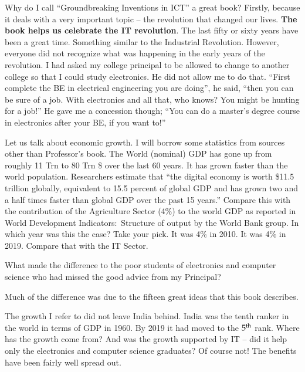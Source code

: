 \begin{multicols}{2}

Why do I call “Groundbreaking Inventions in ICT” a great book? Firstly, because it deals with a very important topic – the revolution that changed our lives. \textbf{The book helps us celebrate the IT revolution}. The last fifty or sixty years have been a great time. Something similar to the Industrial Revolution. However, everyone did not recognize what was happening in the early years of the revolution. I had asked my college principal to be allowed to change to another college so that I could study electronics. He did not allow me to do that. “First complete the BE in electrical engineering you are doing”, he said, “then you can be sure of a job. With electronics and all that, who knows? You might be hunting for a job!” He gave me a concession though; “You can do a master’s degree course in electronics after your BE, if you want to!”

\vspace{-.1cm}

Let us talk about economic growth. I will borrow some statistics from sources other than Professor’s book. The World (nominal) GDP has gone up from roughly 11 Trn to 80 Trn \$ over the last 60 years. It has grown faster than the world population. Researchers estimate that “the digital economy is worth \$11.5 trillion globally, equivalent to 15.5 percent of global GDP and has grown two and a half times faster than global GDP over the past 15 years.” Compare this with the contribution of the Agriculture Sector (4\%) to the world GDP as reported in World Development Indicators: Structure of output \cite{art3-key01} by the World Bank group. In which year was this the case? Take your pick. It was 4\% in 2010. It was 4\% in 2019. Compare that with the IT Sector.

\vspace{-.1cm}

What made the difference to the poor students of electronics and computer science who had missed the good advice from my Principal?

\vspace{-.1cm}

Much of the difference was due to the fifteen great ideas that this book describes. 

\vspace{-.1cm}

The growth I refer to did not leave India behind. India was the tenth ranker in the world in terms of GDP in 1960. By 2019 it had moved to the $5^{\rm th}$ rank. Where has the growth come from?  And was the growth supported by IT – did it help only the electronics and computer science graduates? Of course not! The benefits have been fairly well spread out.


\end{multicols}
